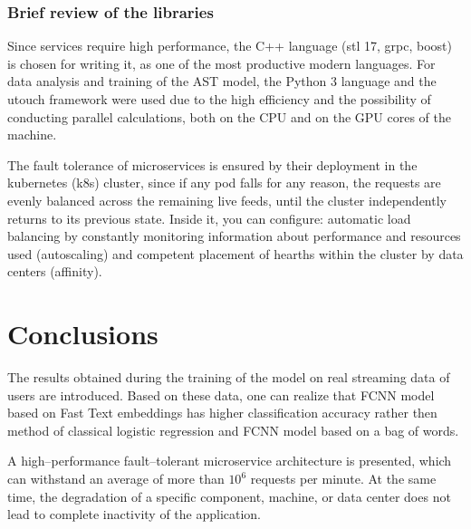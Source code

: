 \documentclass[12pt]{jpconf}
\begin{document}
\subsubsection{Brief review of the libraries}

Since services require high performance, the C++ language (stl 17, grpc, boost) is chosen for writing it, as one of the most productive modern languages. For data analysis and training of the AST model, the Python 3 language and the utouch framework were used due to the high efficiency and the possibility of conducting parallel calculations, both on the CPU and on the GPU cores of the machine.

The fault tolerance of microservices is ensured by their deployment in the kubernetes (k8s) cluster, since if any pod falls for any reason, the requests are evenly balanced across the remaining live feeds, until the cluster independently returns to its previous state. Inside it, you can configure: automatic load balancing by constantly monitoring information about performance and resources used (autoscaling) and competent placement of hearths within the cluster by data centers (affinity).

\section{Conclusions}

The results obtained during the training of the model on real streaming data of users are introduced. Based on these data, one can realize that \textsf{FCNN} model based on Fast Text embeddings has higher classification accuracy rather then method of classical logistic regression and \textsf{FCNN}  model based on a bag of words.


A high--performance fault--tolerant microservice architecture is presented, which can withstand an average of more than $10^6$  requests per minute. At the same time, the degradation of a specific component, machine, or data center does not lead to complete inactivity of the application.
\end{document}
